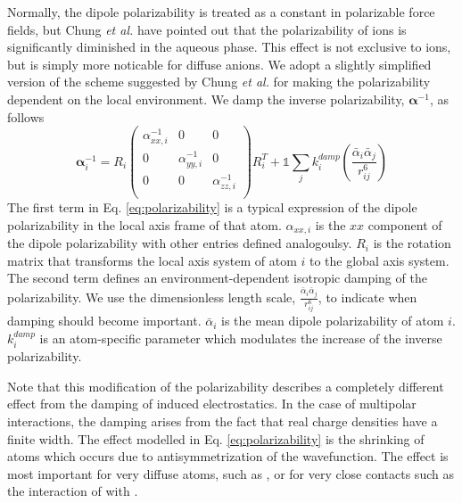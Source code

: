 \documentclass[journal=jacsat,manuscript=article]{achemso}
\begin{document}
Normally, the dipole polarizability is treated as a constant in polarizable force fields,
but Chung \textit{et al.} have pointed out that the polarizability of ions
is significantly diminished in the aqueous phase.\cite{chung2022classical}
This effect is not exclusive to ions, but is simply more noticable for diffuse anions. We adopt a slightly
simplified version of the scheme suggested by Chung \textit{et al.} for making the polarizability dependent on the local
environment. We damp the inverse polarizability, $\bm{\alpha}^{-1}$, as follows
\begin{equation}
  \bm{\alpha}^{-1}_i=
  R_i\begin{pmatrix}
    \alpha^{-1}_{xx,i} & 0 & 0 \\
    0 & \alpha^{-1}_{yy,i} & 0 \\
    0 & 0 & \alpha^{-1}_{zz,i} \\
  \end{pmatrix}R_i^T
    +\mathds{1}\sum_{j}k^{damp}_{i}\left(\frac{\bar{\alpha}_i\bar{\alpha}_j}{r_{ij}^6}\right)
    \label{eq:polarizability}
\end{equation}
\noindent
The first term in Eq. \ref{eq:polarizability} is a typical expression of the dipole polarizability
in the local axis frame of that atom. $\alpha_{xx,i}$ is the $xx$ component of the dipole polarizability
with other entries defined analogoulsy. $R_i$ is the rotation matrix that transforms the local
axis system of atom $i$ to the global axis system. The second term defines an environment-dependent
isotropic damping of the polarizability. We use the dimensionless length scale, $\frac{\bar{\alpha}_i\bar{\alpha}_j}{r_{ij}^6}$,
to indicate when damping should become important. $\bar{\alpha}_i$ is the mean dipole polarizability of atom $i$.
$k_{i}^{damp}$ is an atom-specific parameter which modulates the increase of the inverse polarizability.

Note that this modification of the polarizability describes a completely different
effect from the damping of induced electrostatics. In the case of multipolar interactions,
the damping arises from the fact that real charge densities have a finite width. The effect
modelled in Eq. \ref{eq:polarizability} is the shrinking of atoms which occurs due to
antisymmetrization of the wavefunction. The effect is most important for very diffuse atoms, such as ,
or for very close contacts such as the interaction of  with .
\end{document}
